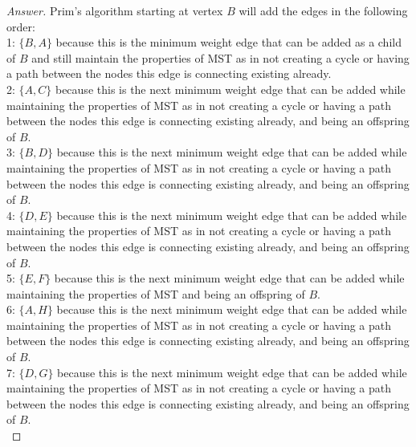 \documentclass[11pt]{article}
\theoremstyle{definition}
\theoremstyle{definition}
\theoremstyle{definition}
\begin{document}
\begin{proof}[Answer]
Prim's algorithm starting at vertex $B$ will add the edges in the following order:\\
1: $\{B, A\}$ because this is the minimum weight edge that can be added as a child of $B$ and still maintain the properties of MST as in not creating a cycle or having a path between the nodes this edge is connecting existing already.\\
2: $\{A, C\}$ because this is the next minimum weight edge that can be added while maintaining the properties of MST as in not creating a cycle or having a path between the nodes this edge is connecting existing already, and being an offspring of $B$.\\
3: $\{B, D\}$ because this is the next minimum weight edge that can be added while maintaining the properties of MST as in not creating a cycle or having a path between the nodes this edge is connecting existing already, and being an offspring of $B$.\\
4: $\{D, E\}$ because this is the next minimum weight edge that can be added while maintaining the properties of MST as in not creating a cycle or having a path between the nodes this edge is connecting existing already, and being an offspring of $B$.\\
5: $\{E, F\}$ because this is the next minimum weight edge that can be added while maintaining the properties of MST and being an offspring of $B$.\\
6: $\{A, H\}$ because this is the next minimum weight edge that can be added while maintaining the properties of MST as in not creating a cycle or having a path between the nodes this edge is connecting existing already, and being an offspring of $B$.\\
7: $\{D, G\}$ because this is the next minimum weight edge that can be added while maintaining the properties of MST as in not creating a cycle or having a path between the nodes this edge is connecting existing already, and being an offspring of $B$.\\
\end{proof}
\end{document}
